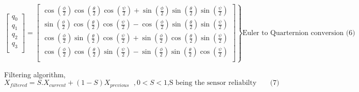 \documentclass[11pt]{report}
\begin{document}
	\vspace{20pt}\noindent$$
	\left.
	\begin{bmatrix}
		q_0\\
		q_1\\
		q_2\\
		q_3\\
	\end{bmatrix}
	= \begin{bmatrix}
		\cos\left(\frac{\phi}{2}\right)\cos\left(\frac{\theta}{2}\right)\cos\left(\frac{\psi}{2}\right)+\sin\left(\frac{\phi}{2}\right)\sin\left(\frac{\theta}{2}\right)\sin\left(\frac{\psi}{2}\right)\\
		\sin\left(\frac{\phi}{2}\right)\cos\left(\frac{\theta}{2}\right)\cos\left(\frac{\psi}{2}\right)-\cos\left(\frac{\phi}{2}\right)\sin\left(\frac{\theta}{2}\right)\sin\left(\frac{\psi}{2}\right)\\
		\cos\left(\frac{\phi}{2}\right)\sin\left(\frac{\theta}{2}\right)\cos\left(\frac{\psi}{2}\right)+\sin\left(\frac{\phi}{2}\right)\cos\left(\frac{\theta}{2}\right)\sin\left(\frac{\psi}{2}\right)\\
		\cos\left(\frac{\phi}{2}\right)\cos\left(\frac{\theta}{2}\right)\sin\left(\frac{\psi}{2}\right)-\sin\left(\frac{\phi}{2}\right)\sin\left(\frac{\theta}{2}\right)\cos\left(\frac{\psi}{2}\right)\\
	\end{bmatrix}
	\right \}\text{Euler to Quarternion conversion (6)}
	$$
	
	\vspace{20pt}\noindent Filtering algorithm,
	\noindent$$
	X_{filtered} = S.X_{current} + \left(1-S\right)X_{previous} \hspace{7pt},
	0 < S < 1\text{,S being the sensor reliabilty}\hspace{23pt}\text{(7)}
	$$
	
\end{document}
